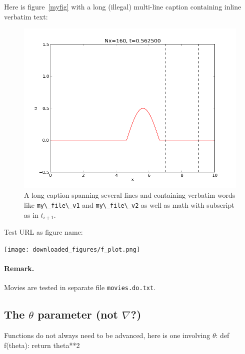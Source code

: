 \documentclass[%
oneside,                 %
final,                   %
10pt]{article}
\theoremstyle{definition}
\begin{document}
\begin{enumerate}
\vspace{6mm}
Here is figure~\vref{myfig} with a long (illegal) multi-line caption
containing inline verbatim text:
\begin{figure}
  \centering
  \includegraphics[width=0.9\linewidth]{testfigs/wave1D.png}
  \caption{
  A long caption spanning several lines and containing verbatim words like \protect \Verb!my\_file\_v1! and \protect \Verb!my\_file\_v2! as well as math with subscript as in $t_{i+1}$. \label{myfig}
  }
\end{figure}
Test URL as figure name:
\vspace{6mm}
\centerline{\texttt{[image: downloaded\_figures/f\_plot.png]}}
\vspace{6mm}
\paragraph{Remark.}
Movies are tested in separate file \texttt{movies.do.txt}.
\subsection{The $\theta$ parameter (not $\nabla$?)}
\label{decay:sec:theta}
Functions do not always need to be advanced, here is one
involving $\theta$:
\bccq
def f(theta):
    return theta**2

\eccq


\end{enumerate}
\end{document}

